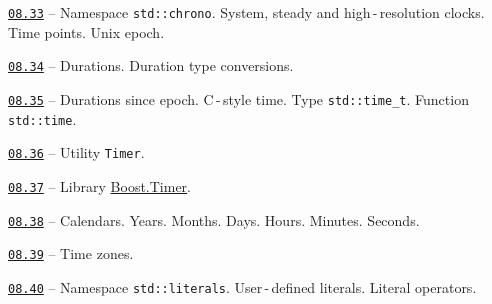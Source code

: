 \documentclass[a4paper,12pt]{article}
\renewenvironment{itemize}
{
    \begin{list}{\labelitemi}
    {
      \setlength{\topsep}{0pt}
      \setlength{\partopsep}{0pt}
      \setlength{\parskip}{0pt}
      \setlength{\itemsep}{0pt}
      \setlength{\parsep}{0pt}
      \setlength{\leftmargin}{14.5pt}
    }
}{\end{list}}
\begin{document}
\medskip\smallskip

\begin{itemize}

    \item \href{https://github.com/i-s-m-mipt/Education/blob/master/projects/examples/source/08.33.cpp}{\texttt{08.33}} -- Namespace \lstinline{std::chrono}. System, steady and high\,-\,resolution clocks. Time points. Unix epoch.

    \smallskip

    \item \href{https://github.com/i-s-m-mipt/Education/blob/master/projects/examples/source/08.34.cpp}{\texttt{08.34}} -- Durations. Duration type conversions.

    \smallskip

    \item \href{https://github.com/i-s-m-mipt/Education/blob/master/projects/examples/source/08.35.cpp}{\texttt{08.35}} -- Durations since epoch. C\,-\,style time. Type \lstinline{std::time_t}. Function \lstinline{std::time}.

    \smallskip

    \item \href{https://github.com/i-s-m-mipt/Education/blob/master/projects/examples/source/08.36.cpp}{\texttt{08.36}} -- Utility \lstinline{Timer}.

    \smallskip

    \item \href{https://github.com/i-s-m-mipt/Education/blob/master/projects/examples/source/08.37.cpp}{\texttt{08.37}} -- Library \href{https://www.boost.org/doc/libs/1_85_0/libs/timer/doc/index.html}{Boost.Timer}.

    \smallskip

    \item \href{https://github.com/i-s-m-mipt/Education/blob/master/projects/examples/source/08.38.cpp}{\texttt{08.38}} -- Calendars. Years. Months. Days. Hours. Minutes. Seconds.

    \smallskip

    \item \href{https://github.com/i-s-m-mipt/Education/blob/master/projects/examples/source/08.39.cpp}{\texttt{08.39}} -- Time zones.

    \smallskip

    \item \href{https://github.com/i-s-m-mipt/Education/blob/master/projects/examples/source/08.40.cpp}{\texttt{08.40}} -- Namespace \lstinline{std::literals}. User\,-\,defined literals. Literal operators.

\end{itemize}
\end{document}
